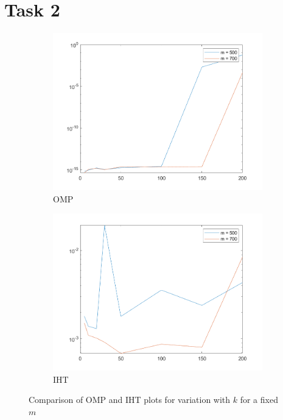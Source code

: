 \documentclass[a4paper, landscape]{article}
\begin{document}
\section{Task 2}
\begin{figure}[H]
    \centering
    \begin{subfigure}{0.45\linewidth}
        \centering
        \includegraphics[width=\linewidth]{omp/plot m.png}
        \caption{OMP}
    \end{subfigure}
    \begin{subfigure}{0.45\linewidth}
        \centering
        \includegraphics[width=\linewidth]{iht/plot m.png}
        \caption{IHT}
    \end{subfigure}
    \caption{Comparison of OMP and IHT plots for variation with $k$ for a fixed $m$}
    \label{fig:ck}
\end{figure}
\end{document}
